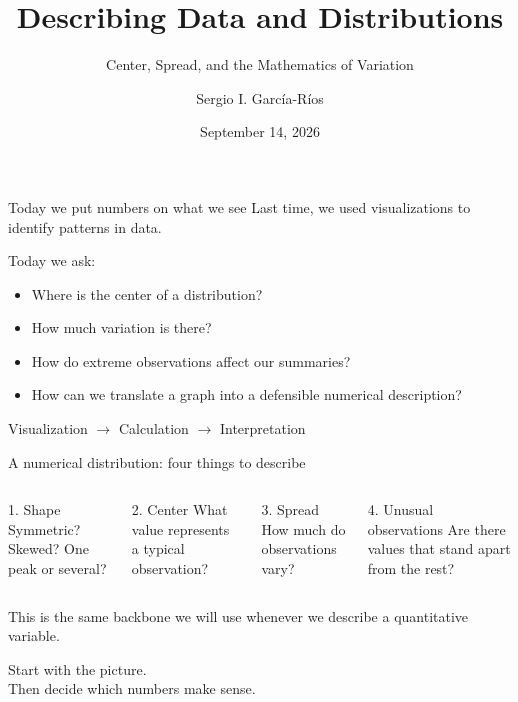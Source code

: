 \documentclass[11pt,aspectratio=169]{beamer}
\author{Sergio I. Garc\'ia-R\'ios}
\title{Describing Data and Distributions}
\subtitle{Center, Spread, and the Mathematics of Variation}
\institute{PA 311N: Data Analysis for Public Policy\\LBJ School of Public Affairs}
\date{September 14, 2026}
\begin{document}
\maketitle

\begin{frame}{Today we put numbers on what we see}
Last time, we used visualizations to identify patterns in data.

\vspace{0.6em}
Today we ask:
\begin{itemize}
  \item Where is the \alert{center} of a distribution?
  \item How much \alert{variation} is there?
  \item How do extreme observations affect our summaries?
  \item How can we translate a graph into a defensible numerical description?
\end{itemize}

\vfill
\begin{center}
\Large Visualization $\longrightarrow$ Calculation $\longrightarrow$ Interpretation
\end{center}
\end{frame}

\begin{frame}{A numerical distribution: four things to describe}
\begin{columns}[T,onlytextwidth]
\begin{block}{1. Shape}
Symmetric? Skewed? One peak or several?
\end{block}
\begin{block}{2. Center}
What value represents a typical observation?
\end{block}
\begin{block}{3. Spread}
How much do observations vary?
\end{block}
\begin{block}{4. Unusual observations}
Are there values that stand apart from the rest?
\end{block}
\end{columns}

\vfill
\alert{This is the same backbone we will use whenever we describe a quantitative variable.}
\end{frame}

\begin{frame}[standout]
\Large Start with the picture.\\[0.5em]
\normalsize Then decide which numbers make sense.
\end{frame}
\end{document}
